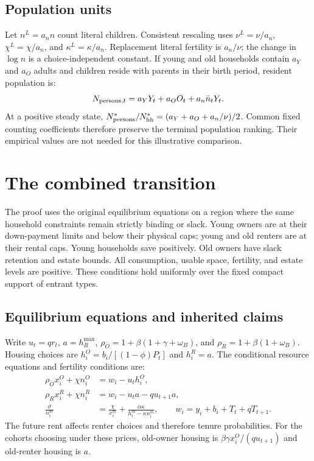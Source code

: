 \documentclass[11pt]{article}
\begin{document}
\subsection{Population units}
\label{app:amend_units}

Let $n^L=a_n n$ count literal children. Consistent rescaling uses
$\nu^L=\nu/a_n$, $\chi^L=\chi/a_n$, and $\kappa^L=\kappa/a_n$.
Replacement literal fertility is $a_n/\nu$; the change in $\log n$ is a
choice-independent constant. If young and old households contain
$a_Y$ and $a_O$ adults and children reside with parents in their birth
period, resident population is:
\begin{equation}
 N_{{\rm persons},t}=a_YY_t+a_OO_t+a_n\bar n_tY_t.
 \label{eq:amend_persons}
\end{equation}
At a positive steady state,
$N_{\rm persons}^*/N_{\rm hh}^*=(a_Y+a_O+a_n/\nu)/2$.
Common fixed counting coefficients therefore preserve the terminal
population ranking. Their empirical values are not needed for this
illustrative comparison.

\section{The combined transition}
\label{app:amend_transition}

The proof uses the original equilibrium equations on a region where the
same household constraints remain strictly binding or slack. Young owners
are at their down-payment limits and below their physical caps; young and
old renters are at their rental caps. Young households save positively.
Old owners have slack retention and estate bounds. All consumption,
usable space, fertility, and estate levels are positive. These conditions
hold uniformly over the fixed compact support of entrant types.

\subsection{Equilibrium equations and inherited claims}

Write $u_t=q r_t$, $a=h_R^{\max}$,
$\rho_O=1+\beta(1+\gamma+\omega_B)$, and
$\rho_R=1+\beta(1+\omega_B)$. Housing choices are
$h_i^O=b_i/[(1-\phi)P_t]$ and $h_i^R=a$.
The conditional resource equations and fertility conditions are:
\begin{align}
 \rho_Ox_i^O+\chi n_i^O&=w_i-u_th_i^O,\nonumber\\
 \rho_Rx_i^R+\chi n_i^R&=w_i-u_ta-qu_{t+1}a,\nonumber\\
 \frac{\vartheta}{n_i^m}&=\frac{\chi}{x_i^m}
  +\frac{\alpha\kappa}{h_i^m-\kappa n_i^m},\qquad
 w_i=y_i+b_i+T_t+qT_{t+1}.
 \label{eq:amend_transition_choices}
\end{align}
The future rent affects renter choices and therefore tenure probabilities.
For the cohorts choosing under these prices, old-owner housing is
$\beta\gamma x_i^O/(qu_{t+1})$ and old-renter housing is $a$.
\end{document}

